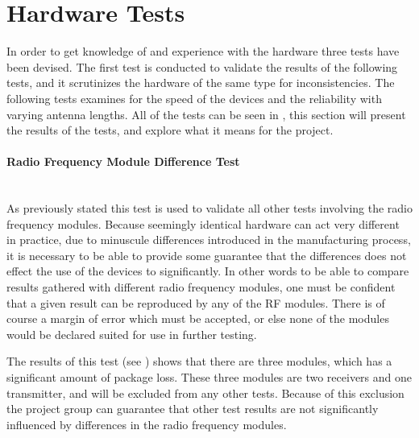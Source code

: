 \clearpage
\section{Hardware Tests} %
\label{sec:hardware_tests}
In order to get knowledge of and experience with the hardware three tests have been devised.
The first test is conducted to validate the results of the following tests, and it scrutinizes the hardware of the same type for inconsistencies.
The following tests examines for the speed of the devices and the reliability with varying antenna lengths.
All of the tests can be seen in , this section will present the results of the tests, and explore what it means for the project.

\paragraph{Radio Frequency Module Difference Test}%
\label{par:radio_frequency_module_difference_test}\hfill\\
As previously stated this test is used to validate all other tests involving the radio frequency modules.
Because seemingly identical hardware can act very different in practice, due to minuscule differences introduced in the manufacturing process, it is necessary to be able to provide some guarantee that the differences does not effect the use of the devices to significantly.
In other words to be able to compare results gathered with different radio frequency modules, one must be confident that a given result can be reproduced by any of the RF modules.
There is of course a margin of error which must be accepted, or else none of the modules would be declared suited for use in further testing.

The results of this test (see ) shows that there are three modules, which has a significant amount of package loss.
These three modules are two receivers and one transmitter, and will be excluded from any other tests.
Because of this exclusion the project group can guarantee that other test results are not significantly influenced by differences in the radio frequency modules. 

